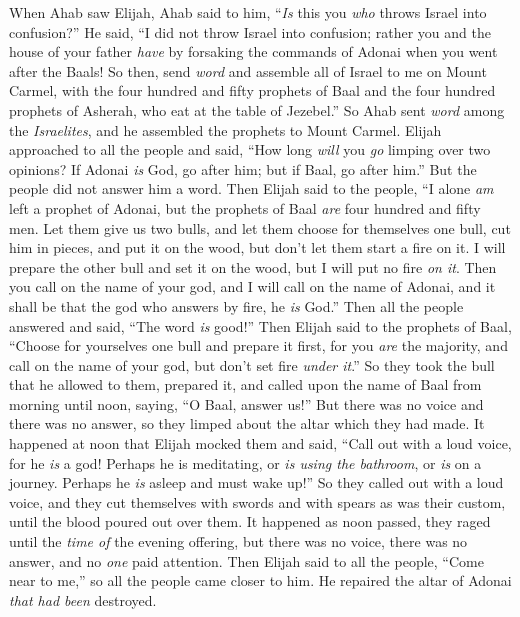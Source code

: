\begin{biblechapter}
\verse When Ahab saw Elijah, Ahab said to him, “\textit{Is} this you \textit{who} throws Israel into confusion?”
\verse He said, “I did not throw Israel into confusion; rather you and the house of your father \textit{have} by forsaking the commands of Adonai when you went after the Baals!
\verse So then, send \textit{word} and assemble all of Israel to me on Mount Carmel, with the four hundred and fifty prophets of Baal and the four hundred prophets of Asherah, who eat at the table of Jezebel.”
\verse So Ahab sent \textit{word} among the \textit{Israelites}, and he assembled the prophets to Mount Carmel.
\verse Elijah approached to all the people and said, “How long \textit{will} you \textit{go} limping over two opinions? If Adonai \textit{is} God, go after him; but if Baal, go after him.” But the people did not answer him a word.
\verse Then Elijah said to the people, “I alone \textit{am} left a prophet of Adonai, but the prophets of Baal \textit{are} four hundred and fifty men.
\verse Let them give us two bulls, and let them choose for themselves one bull, cut him in pieces, and put it on the wood, but don’t let them start a fire on it. I will prepare the other bull and set it on the wood, but I will put no fire \textit{on it}.
\verse Then you call on the name of your god, and I will call on the name of Adonai, and it shall be that the god who answers by fire, he \textit{is} God.” Then all the people answered and said, “The word \textit{is} good!”
\verse Then Elijah said to the prophets of Baal, “Choose for yourselves one bull and prepare it first, for you \textit{are} the majority, and call on the name of your god, but don’t set fire \textit{under it}.”
\verse So they took the bull that he allowed to them, prepared it, and called upon the name of Baal from morning until noon, saying, “O Baal, answer us!” But there was no voice and there was no answer, so they limped about the altar which they had made.
\verse It happened at noon that Elijah mocked them and said, “Call out with a loud voice, for he \textit{is} a god! Perhaps he is meditating, or \textit{is using the bathroom}, or \textit{is} on a journey. Perhaps he \textit{is} asleep and must wake up!”
\verse So they called out with a loud voice, and they cut themselves with swords and with spears as was their custom, until the blood poured out over them.
\verse It happened as noon passed, they raged until the \textit{time of} the evening offering, but there was no voice, there was no answer, and no \textit{one} paid attention.
\verse Then Elijah said to all the people, “Come near to me,” so all the people came closer to him. He repaired the altar of Adonai \textit{that had been} destroyed.

\end{biblechapter}
